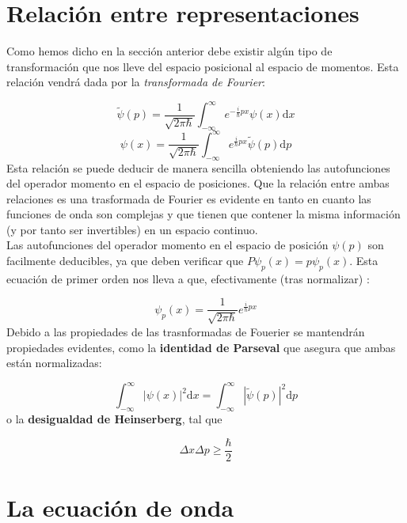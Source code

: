 \documentclass[12pt]{book}
\numberwithin{equation}{chapter}
\numberwithin{figure}{chapter}
\newcommand{\D}{\mathrm{d}}
\newcommand{\intinf}{\int_{-\infty}^{\infty}}
\begin{document}
\section{Relación entre representaciones}

Como hemos dicho en la sección anterior debe existir algún tipo de transformación que nos lleve del espacio posicional al espacio de momentos. Esta relación vendrá dada por la {\it transformada de Fourier}:

\begin{equation}
\tilde{\psi} (p) = \frac{1}{\sqrt{2 \pi \hbar}} \intinf e^{-\frac{i}{\hbar} p x}  \psi  (x)  \D x
\end{equation}
\begin{equation}
{\psi} (x) = \frac{1}{\sqrt{2 \pi \hbar}} \intinf e^{\frac{i}{\hbar} p x}  \tilde{\psi}  (p)  \D p
\end{equation}
Esta relación se puede deducir de manera sencilla obteniendo las autofunciones del operador momento en el espacio de posiciones. Que la relación entre ambas relaciones es una trasformada de Fourier es evidente en tanto en cuanto las funciones de onda son complejas y que tienen que contener la misma información (y por tanto ser invertibles) en un espacio continuo. \\

Las autofunciones del operador momento en el espacio de posición  $\psi(p)$ son facilmente deducibles, ya que deben verificar que $P \psi_p(x)=p \psi_p (x)$. Esta ecuación de primer orden nos lleva a que, efectivamente (tras normalizar) :

\begin{equation}
\psi_p(x)=\frac{1}{\sqrt{2\pi \hbar}} e^{\frac{i}{\hbar} px}
\end{equation}
Debido a las propiedades de las trasnformadas de Fouerier se mantendrán propiedades evidentes, como la \textbf{identidad de Parseval} que asegura que ambas están normalizadas:

\begin{equation}
\intinf |\psi(x)|^2 \D x = \intinf |\tilde{\psi} (p) |^2 \D p
\end{equation}
o la \textbf{desigualdad de Heinserberg}, tal que

\begin{equation}
\Delta x \Delta p \geq \frac{\hbar}{2}
\end{equation}

\section{La ecuación de onda}
\end{document}
